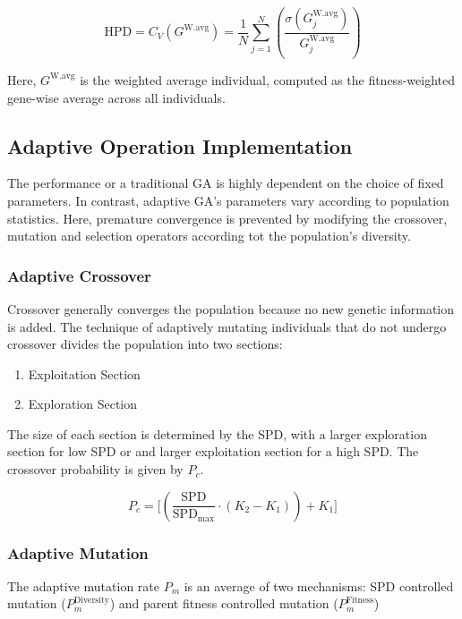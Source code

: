 \documentclass[../main.tex]{subfiles}
\begin{document}
\begin{equation}
\text{HPD} = C_V(G^{\text{W.avg}}) = \frac{1}{N} \sum_{j=1}^N \left( \frac{\sigma
(G^{\text{W.avg}}_j)}{G^{\text{W.avg}}_j} \right)
\end{equation}

Here, $G^{\text{W.avg}}$ is the weighted average individual, computed as the fitness-weighted gene-wise average across
all individuals.

\subsection{Adaptive Operation Implementation}

The performance or a traditional GA is highly dependent on the choice of fixed parameters. In contrast, adaptive GA's
parameters vary according to population statistics. Here, premature convergence is prevented by modifying the
crossover, mutation and selection operators according tot the population's diversity.

\subsubsection{Adaptive Crossover}

Crossover generally converges the population because no new genetic information is  added. The technique of adaptively
mutating individuals that do not undergo crossover divides the population into two sections:

\begin{enumerate}
	\item Exploitation Section
	\item Exploration Section
\end{enumerate}

The size of each section is determined by the SPD, with a larger exploration section for low SPD or and larger
exploitation section for a high SPD. The crossover probability is given by $P_c$.

\begin{equation}
P_c = \bigg[ \left( \frac{\text{SPD}}{\text{SPD}_\text{max}} \cdot (K_2 - K_1) \right) + K_1 \bigg]
\end{equation}

\subsubsection{Adaptive Mutation}
The adaptive mutation rate $P_m$ is an average of two mechanisms: SPD controlled mutation ($P_m^{\text{Diversity}}$)
and parent fitness controlled mutation ($P_m^{\text{Fitness}}$)
\end{document}

